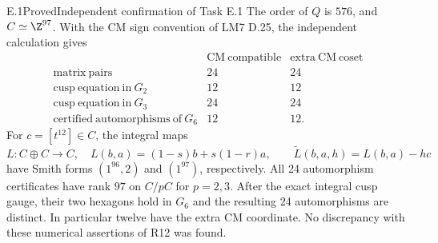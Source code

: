 \begin{statement}{E.1}{Proved}{Independent confirmation of Task E.1}
The order of $Q$ is $576$, and $C\simeq\Z^{97}$. With the CM sign
convention of LM7 D.25, the independent calculation gives
\[
\begin{array}{l|rr}
 &\mathrm{CM\ compatible}&\mathrm{extra\ CM\ coset}\\\hline
 \mathrm{matrix\ pairs}&24&24\\
 \mathrm{cusp\ equation\ in}\ G_2&12&12\\
 \mathrm{cusp\ equation\ in}\ G_3&24&24\\
 \mathrm{certified\ automorphisms\ of}\ G_6&12&12.
\end{array}
\]
For $c=[t^{12}]\in C$, the integral maps
\[
 L:C\oplus C\to C,\quad L(b,a)=(1-s)b+s(1-r)a,
 \qquad\widetilde L(b,a,h)=L(b,a)-hc
\]
have Smith forms $(1^{96},2)$ and $(1^{97})$, respectively.
All 24 automorphism certificates have rank $97$ on $C/pC$ for
$p=2,3$. After the exact integral cusp gauge, their two hexagons
hold in $G_6$ and the resulting 24 automorphisms are distinct.
In particular twelve have the extra CM coordinate. No discrepancy
with these numerical assertions of R12 was found.
\end{statement}
